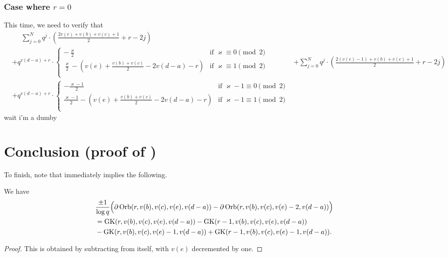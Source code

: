 \subsubsection{Case where $r = 0$}
This time, we need to verify that
\begin{align*}
  &\phantom= \sum_{j=0}^N q^j
  \cdot \left( \frac{2v(e)+v(b)+v(c)+1}{2} + r - 2j \right) \\
  & + q^{v(d-a)+r} \cdot
  \begin{cases}
    -\frac{\varkappa}{2} & \text{if }\varkappa \equiv 0 \pmod 2 \\
    \frac{\varkappa}{2} - \left( v(e)+\frac{v(b)+v(c)}{2}-2v(d-a)-r \right)
    & \text{if }\varkappa \equiv 1 \pmod 2 \\
  \end{cases}
  &+ \sum_{j=0}^N q^j
  \cdot \left( \frac{2(v(e)-1)+v(b)+v(c)+1}{2} + r - 2j \right) \\
  & + q^{v(d-a)+r} \cdot
  \begin{cases}
    -\frac{\varkappa-1}{2} & \text{if }\varkappa-1 \equiv 0 \pmod 2 \\
    \frac{\varkappa-1}{2} - \left( v(e)+\frac{v(b)+v(c)}{2}-2v(d-a)-r \right)
    & \text{if }\varkappa-1 \equiv 1 \pmod 2 \\
  \end{cases}
\end{align*}
wait i'm a dumby

\section{Conclusion (proof of )}
To finish, note that  immediately implies the following.
\begin{corollary}
  \label{cor:finale_by_two}
  We have
  \begin{align*}
    &\frac{\pm1}{\log q}\Big(\partial\operatorname{Orb}(r, v(b), v(c), v(e), v(d-a)) - \partial\operatorname{Orb}(r, v(b), v(c), v(e)-2, v(d-a))\Big) \\
    &= \operatorname{GK}(r, v(b), v(c), v(e), v(d-a)) - \operatorname{GK}(r-1, v(b), v(c), v(e), v(d-a)) \\
    &- \operatorname{GK}(r, v(b), v(c), v(e)-1, v(d-a)) + \operatorname{GK}(r-1, v(b), v(c), v(e)-1, v(d-a)).
  \end{align*}
\end{corollary}
\begin{proof}
  This is obtained by subtracting  from itself,
  with $v(e)$ decremented by one.
\end{proof}

